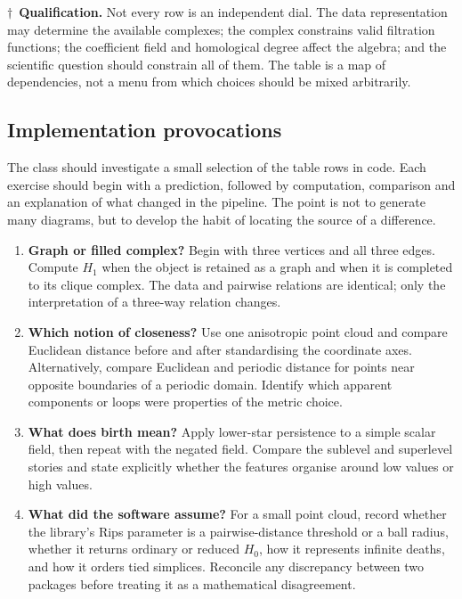 \documentclass[11pt,a4paper]{article}
\newcommand{\planningbox}[2]{%
\subsection*{#1}
#2
}
\newcommand{\qualification}[1]{%
\par\smallskip
\noindent\textcolor{blue!70!black}{\(\dagger\)\ \textbf{Qualification.}} #1
\par\smallskip
}
\begin{document}
{\qualification{Not every row is an independent dial. The data representation
may determine the available complexes; the complex constrains valid filtration
functions; the coefficient field and homological degree affect the algebra; and
the scientific question should constrain all of them. The table is a map of
dependencies, not a menu from which choices should be mixed arbitrarily.}

}

\planningbox{Implementation provocations}{
The class should investigate a small selection of the table rows in code. Each
exercise should begin with a prediction, followed by computation, comparison and
an explanation of what changed in the pipeline. The point is not to generate
many diagrams, but to develop the habit of locating the source of a difference.

\begin{enumerate}
    \item \textbf{Graph or filled complex?} Begin with three vertices and all
    three edges. Compute $H_1$ when the object is retained as a graph and when it
    is completed to its clique complex. The data and pairwise relations are
    identical; only the interpretation of a three-way relation changes.

    \item \textbf{Which notion of closeness?} Use one anisotropic point cloud
    and compare Euclidean distance before and after standardising the coordinate
    axes. Alternatively, compare Euclidean and periodic distance for points near
    opposite boundaries of a periodic domain. Identify which apparent
    components or loops were properties of the metric choice.

    \item \textbf{What does birth mean?} Apply lower-star persistence to a
    simple scalar field, then repeat with the negated field. Compare the sublevel
    and superlevel stories and state explicitly whether the features organise
    around low values or high values.

    \item \textbf{What did the software assume?} For a small point cloud, record
    whether the library's Rips parameter is a pairwise-distance threshold or a
    ball radius, whether it returns ordinary or reduced $H_0$, how it represents
    infinite deaths, and how it orders tied simplices. Reconcile any discrepancy
    between two packages before treating it as a mathematical disagreement.


\end{enumerate}}
\end{document}
